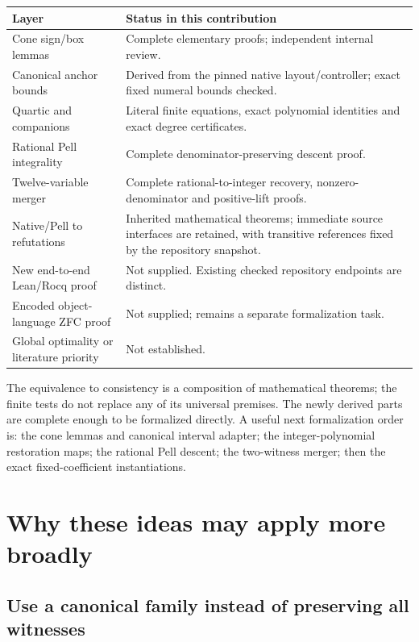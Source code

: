 \documentclass[11pt]{article}
\theoremstyle{remark}\newtheorem{remark}[theorem]{Remark}
\begin{document}
\begin{center}\small
\begin{tabular}{>{\raggedright\arraybackslash}p{}>{\raggedright\arraybackslash}p{}}
\toprule
Layer & Status in this contribution\\
\midrule
Cone sign/box lemmas & Complete elementary proofs; independent internal review.\\
Canonical anchor bounds & Derived from the pinned native layout/controller; exact fixed numeral bounds checked.\\
Quartic and companions & Literal finite equations, exact polynomial identities and exact degree certificates.\\
Rational Pell integrality & Complete denominator-preserving descent proof.\\
Twelve-variable merger & Complete rational-to-integer recovery, nonzero-denominator and positive-lift proofs.\\
Native/Pell to refutations & Inherited mathematical theorems; immediate source interfaces are retained, with transitive references fixed by the repository snapshot.\\
New end-to-end Lean/Rocq proof & Not supplied. Existing checked repository endpoints are distinct.\\
Encoded object-language ZFC proof & Not supplied; remains a separate formalization task.\\
Global optimality or literature priority & Not established.\\
\bottomrule
\end{tabular}
\end{center}

The equivalence to consistency is a composition of mathematical theorems; the finite tests do not replace any of its universal premises. The newly derived parts are complete enough to be formalized directly. A useful next formalization order is: the cone lemmas and canonical interval adapter; the integer-polynomial restoration maps; the rational Pell descent; the two-witness merger; then the exact fixed-coefficient instantiations.

\section{Why these ideas may apply more broadly}

\subsection{Use a canonical family instead of preserving all witnesses}
\end{document}
